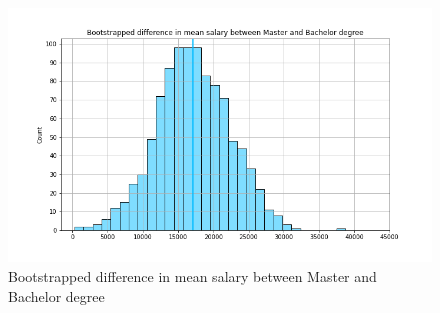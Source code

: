 \documentclass[10pt,onecolumn,letterpaper]{article}
\begin{document}
\begin{figure}[htbp]
  \centering
  \includegraphics[width=1\textwidth]{f25.png}
  \caption{Bootstrapped difference in mean salary between Master and Bachelor degree}
\end{figure}
\end{document}
